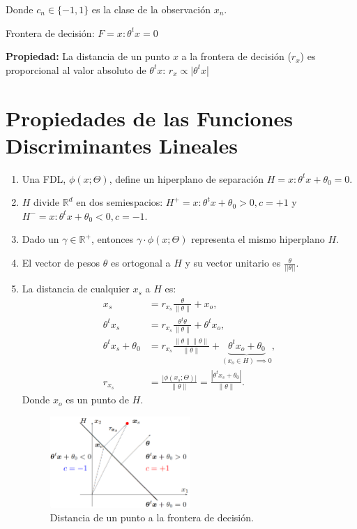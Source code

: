 Donde $c_n \in \{-1, 1\}$ es la clase de la observación $x_n$.

Frontera de decisión: $F = {x: \theta^t x = 0}$

\textbf{Propiedad:} La distancia de un punto $x$ a la frontera de decisión
($r_x$) es proporcional al valor absoluto de $\theta^t x$:
$r_x \propto |\theta^t x$|

\section{Propiedades de las Funciones Discriminantes Lineales}

\begin{enumerate}
    \item Una FDL, $\phi(x; \Theta)$, define un hiperplano de separación
    $H = {x: \theta^t x + \theta_0 = 0}$.
    \item $H$ divide $\mathbb{R}^d$ en dos semiespacios: $H^+ = {x: \theta^t x + \theta_0 > 0}, c = +1$ y $H^- = {x: \theta^t x + \theta_0 < 0}, c = -1$.
    \item Dado un $\gamma \in \mathbb{R^+}$, entonces $\gamma \cdot \phi(x; \Theta)$ representa el mismo hiperplano $H$.
    \item El vector de pesos $\theta$ es ortogonal a $H$ y su vector unitario es $\frac{\theta}{||\theta||}$.
    \item La distancia de cualquier $x_s$ a $H$ es:
    \begin{align*}
        x_s &= r_{x_s} \frac{\theta}{\|\theta\|} + x_o, \\
        \theta^t x_s &= r_{x_s} \frac{\theta^t \theta}{\|\theta\|} + \theta^t x_o, \\
        \theta^t x_s + \theta_0 &= r_{x_s} \frac{\|\theta\| \|\theta\|}{\|\theta\|} + \underbrace{\theta^t x_o + \theta_0}_{(x_o \in H) \implies 0}, \\
        r_{x_s} &= \frac{\left| \phi(x_s; \Theta) \right|}{\|\theta\|} = \frac{\left| \theta^t x_s + \theta_0 \right|}{\|\theta\|}.
    \end{align*}
    Donde $x_o$ es un punto de $H$.

    \begin{figure}[H]
        \centering
        \includegraphics[width=0.5\textwidth]{images/fdl_hiperplano.png}
        \caption{Distancia de un punto a la frontera de decisión.}
    \end{figure}
\end{enumerate}


